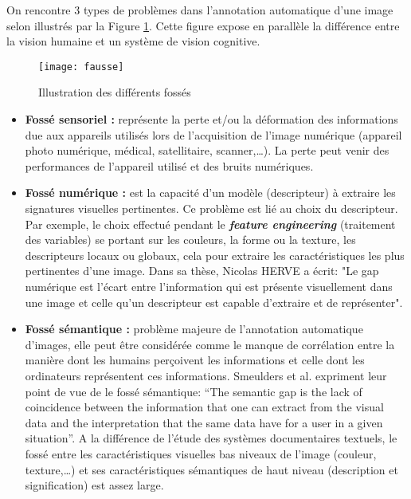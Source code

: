 \medskip

\qquad On rencontre 3 types de problèmes dans l'annotation automatique d'une image selon \cite{smeulders2000content} \cite{boujemaa2004evaluation} illustrés par la Figure  \ref{fig:fausse}. Cette figure expose en parallèle la différence entre la vision humaine et un système de vision cognitive.
\medskip
\begin{figure}[h]
	\begin{center}
		\texttt{[image: fausse]}
		\caption{Illustration des différents fossés \cite{herve2009vers}}
		\label{fig:fausse}
	\end{center}
\end{figure}


\smallskip
\begin{itemize}
	\item \textbf{Fossé sensoriel :} représente la perte et/ou la déformation des informations due aux appareils utilisés lors de l'acquisition de l'image numérique (appareil photo numérique, médical, satellitaire, scanner,…). 
La perte peut venir des performances de l'appareil utilisé et des bruits numériques.
	\item \textbf{{Fossé numérique :}} \cite{herve2009vers} est la capacité d'un modèle (descripteur) à extraire les signatures visuelles pertinentes. Ce problème est lié au choix du descripteur. 
 Par exemple, le choix effectué pendant le \textbf{\textit{feature engineering}} (traitement des variables) se portant sur les couleurs, la forme ou la texture, les descripteurs locaux ou globaux, cela pour extraire les caractéristiques les plus pertinentes d'une image. Dans sa thèse, Nicolas HERVE a écrit: "Le gap numérique est  l'écart entre l’information qui est présente visuellement dans une image et celle qu’un descripteur est capable d'extraire et de représenter".
	\item \textbf{Fossé sémantique :}  problème majeure de l'annotation automatique d'images, elle peut être considérée comme le manque de corrélation entre la manière dont les humains perçoivent les informations et celle dont les ordinateurs représentent ces informations. Smeulders et al. \cite{smeulders2000content} expriment leur point de vue de le fossé sémantique: “The semantic gap is the lack of coincidence between the information that one can extract from the visual data and the interpretation that the same data have for a user in a given situation”.
A la différence de l’étude des systèmes documentaires textuels, le fossé entre les caractéristiques visuelles bas niveaux de l'image (couleur, texture,…) et ses caractéristiques sémantiques de haut niveau (description et signification) est assez large.
\end{itemize}
